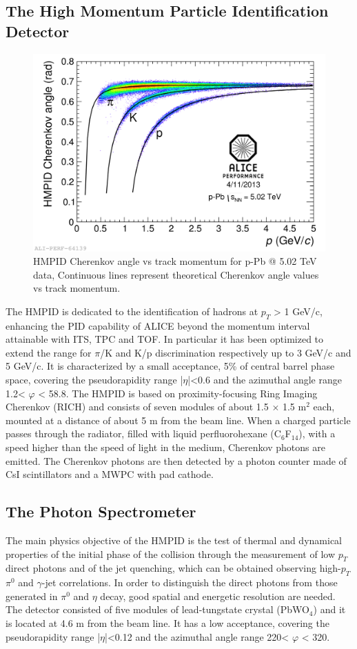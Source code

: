 \subsection*{The High Momentum Particle Identification Detector}
\begin{figure}
  \centering
  \includegraphics[scale=0.15]{figures/HMPID.png}
  \caption{HMPID Cherenkov angle vs track momentum for p-Pb @ 5.02 TeV data, Continuous lines represent theoretical Cherenkov angle values vs track momentum.}
  \label{fig:HMPID}
\end{figure}
%
The HMPID is dedicated to the identification of hadrons at $p_T$ > 1 GeV/c, enhancing the PID capability of ALICE beyond the momentum interval attainable with ITS, TPC and TOF. In particular it has been optimized to extend the range for $\pi$/K and K/p discrimination respectively up to 3 GeV/c and 5 GeV/c. It is characterized by a small acceptance, 5\% of central barrel phase space, covering the pseudorapidity range |$\eta$|<0.6 and the azimuthal angle range 1.2\textdegree < $\varphi$ < 58.8\textdegree. The HMPID is based on proximity-focusing Ring Imaging Cherenkov (RICH) and consists of seven modules of about 1.5 $\times$ 1.5 m$^2$ each, mounted at a distance of about 5 m from the beam line. When a charged particle passes through the radiator, filled with liquid perfluorohexane (C$_6$F$_{14}$), with a speed higher than the speed of light in the medium, Cherenkov photons are emitted. The Cherenkov photons are then detected by a photon counter made of CsI scintillators and a MWPC with pad cathode.
\subsection*{The Photon Spectrometer}
The main physics objective of the HMPID is the test of thermal and dynamical properties of the initial phase of the collision through the measurement of low $p_T$ direct photons and of the jet quenching, which can be obtained observing high-$p_T$ $\pi^0$ and $\gamma$-jet correlations. In order to distinguish the direct photons from those generated in $\pi^0$ and $\eta$ decay, good spatial and energetic resolution are needed. The detector consisted of five modules of lead-tungstate crystal (PbWO$_4$) and it is located at 4.6 m from the beam line. It has a low acceptance, covering the pseudorapidity range |$\eta$|<0.12 and the azimuthal angle range 220\textdegree < $\varphi$ < 320\textdegree.
